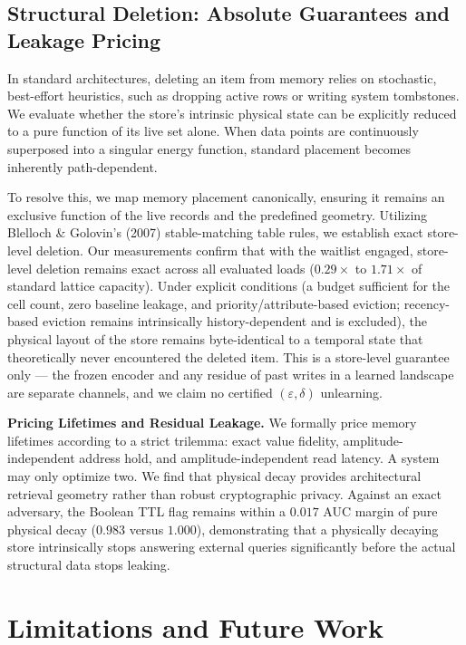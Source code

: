 \documentclass{article}
\begin{document}
\subsection{Structural Deletion: Absolute Guarantees and Leakage Pricing}\label{sec:deletion}

In standard architectures, deleting an item from memory relies on stochastic, best-effort heuristics, such as dropping active rows or writing system tombstones. We evaluate whether the store's intrinsic physical state can be explicitly reduced to a pure function of its live set alone. When data points are continuously superposed into a singular energy function, standard placement becomes inherently path-dependent.

To resolve this, we map memory placement canonically, ensuring it remains an exclusive function of the live records and the predefined geometry. Utilizing Blelloch \& Golovin's (2007) stable-matching table rules, we establish exact store-level deletion. Our measurements confirm that with the waitlist engaged, store-level deletion remains exact across all evaluated loads ($0.29\times$ to $1.71\times$ of standard lattice capacity). Under explicit conditions (a budget sufficient for the cell count, zero baseline leakage, and priority/attribute-based eviction; recency-based eviction remains intrinsically history-dependent and is excluded), the physical layout of the store remains byte-identical to a temporal state that theoretically never encountered the deleted item. This is a store-level guarantee only --- the frozen encoder and any residue of past writes in a learned landscape are separate channels, and we claim no certified $(\varepsilon,\delta)$ unlearning.

\textbf{Pricing Lifetimes and Residual Leakage.} We formally price memory lifetimes according to a strict trilemma: exact value fidelity, amplitude-independent address hold, and amplitude-independent read latency. A system may only optimize two. We find that physical decay provides architectural retrieval geometry rather than robust cryptographic privacy. Against an exact adversary, the Boolean TTL flag remains within a $0.017$ AUC margin of pure physical decay ($0.983$ versus $1.000$), demonstrating that a physically decaying store intrinsically stops answering external queries significantly before the actual structural data stops leaking.

\section{Limitations and Future Work}\label{sec:limits}
\end{document}
